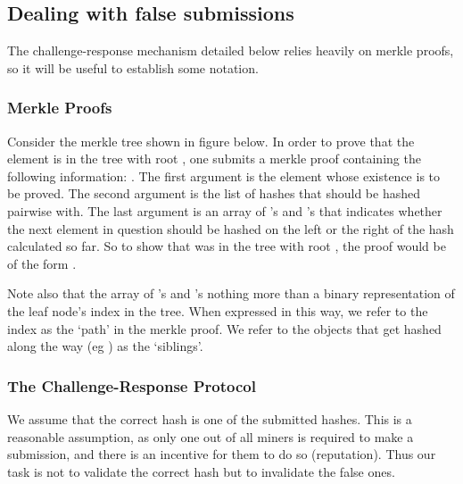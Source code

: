 \subsection{Dealing with false submissions}\label{sec:challengeresponse}
The challenge-response mechanism detailed below relies heavily on merkle proofs, so it will be useful to establish some notation.

\subsubsection{Merkle Proofs}
Consider the merkle tree shown in figure below. In order to prove that the element  is in the tree with root , one submits a merkle proof containing the following information: . The first argument is the element whose existence is to be proved. The second argument is the list of hashes that  should be hashed pairwise with. The last argument is an array of 's and 's that indicates whether the next element in question should be hashed on the left or the right of the hash calculated so far. So to show that  was in the tree with root , the proof would be of the form .
\begin{center}
\end{center}
Note also that the array of 's and 's nothing more than a binary representation of the leaf node's index in the tree. When expressed in this way, we refer to the index as the `path' in the merkle proof. We refer to the objects that get hashed along the way (eg \ascode{[D,E]}) as the `siblings'.
%
\subsubsection{The Challenge-Response Protocol}
We assume that the correct hash is one of the  submitted hashes. This is a reasonable assumption, as only one \rcth out of all miners is required to make a submission, and there is an incentive for them to do so (\rc reputation). Thus our task is not to validate the correct hash but to invalidate the false ones.

